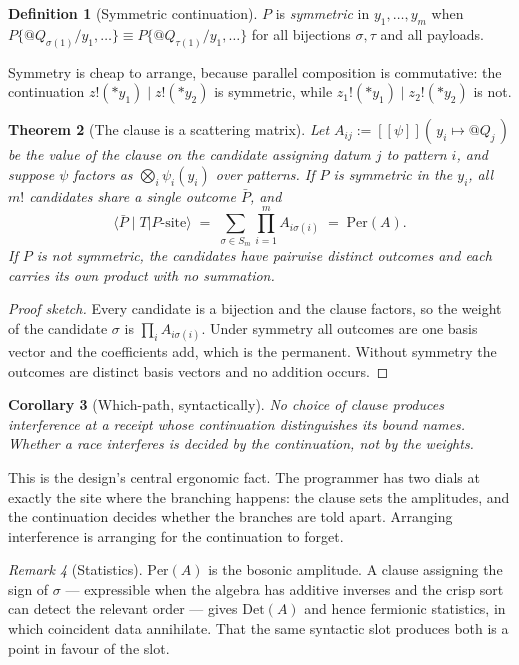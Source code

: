 \documentclass[11pt,a4paper]{article}
\theoremstyle{plain}
\newtheorem{theorem}{Theorem}[section]
\newtheorem{corollary}[theorem]{Corollary}
\theoremstyle{definition}
\newtheorem{definition}[theorem]{Definition}
\theoremstyle{remark}
\newtheorem{remark}[theorem]{Remark}
\newcommand{\sem}[1]{[\![#1]\!]}
\newcommand{\Per}{\mathrm{Per}}
\newcommand{\Det}{\mathrm{Det}}
\newcommand{\scong}{\equiv}
\begin{document}
\begin{definition}[Symmetric continuation]\label{def:sym}
$P$ is \emph{symmetric} in $y_1,\dots,y_m$ when
$P\{@Q_{\sigma(1)}/y_1,\dots\} \scong P\{@Q_{\tau(1)}/y_1,\dots\}$ for all
bijections $\sigma,\tau$ and all payloads.
\end{definition}

Symmetry is cheap to arrange, because parallel composition is commutative: the
continuation $z!(*y_1) \mid z!(*y_2)$ is symmetric, while
$z_1!(*y_1) \mid z_2!(*y_2)$ is not.

\begin{theorem}[The clause is a scattering matrix]\label{thm:scattering}
Let $A_{ij} := \sem{\psi}(\,y_i \mapsto @Q_j\,)$ be the value of the clause on the
candidate assigning datum $j$ to pattern $i$, and suppose $\psi$ factors as
$\bigotimes_i \psi_i(y_i)$ over patterns. If $P$ is symmetric in the $y_i$, all
$m!$ candidates share a single outcome $\bar{P}$, and
\[
  \langle \bar{P} \mid T \lvert P\text{-site}\rangle
  \;=\; \sum_{\sigma \in S_m} \prod_{i=1}^{m} A_{i\sigma(i)}
  \;=\; \Per(A).
\]
If $P$ is not symmetric, the candidates have pairwise distinct outcomes and each
carries its own product with no summation.
\end{theorem}

\begin{proof}[Proof sketch]
Every candidate is a bijection and the clause factors, so the weight of the
candidate $\sigma$ is $\prod_i A_{i\sigma(i)}$. Under symmetry all outcomes are
one basis vector and the coefficients add, which is the permanent. Without
symmetry the outcomes are distinct basis vectors and no addition occurs.
\end{proof}

\begin{corollary}[Which-path, syntactically]\label{cor:whichpath}
No choice of clause produces interference at a receipt whose continuation
distinguishes its bound names. Whether a race interferes is decided by the
continuation, not by the weights.
\end{corollary}

This is the design's central ergonomic fact. The programmer has two dials at
exactly the site where the branching happens: the clause sets the amplitudes, and
the continuation decides whether the branches are told apart. Arranging
interference is arranging for the continuation to forget.

\begin{remark}[Statistics]\label{rem:stats}
$\Per(A)$ is the bosonic amplitude. A clause assigning the sign of $\sigma$ ---
expressible when the algebra has additive inverses and the crisp sort can
detect the relevant order --- gives $\Det(A)$ and hence fermionic statistics, in
which coincident data annihilate. That the same syntactic slot produces both is a
point in favour of the slot.
\end{remark}
\end{document}
